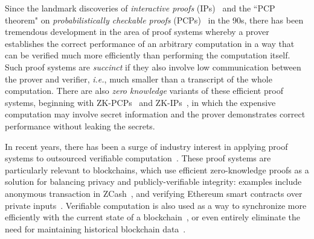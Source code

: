 
Since the landmark discoveries of \emph{interactive proofs} (IPs)~\cite{STOC:GolMicRac85} and the ``PCP theorem" on \emph{probabilistically checkable proofs} (PCPs)~\cite{STOC:BFLS91,FOCS:ALMSS92} in the 90s, there has been tremendous development in the area of proof systems whereby a prover establishes the correct performance of an arbitrary computation in a way that can be verified much more efficiently than performing the computation itself. Such proof systems are \emph{succinct} if they also involve low communication between the prover and verifier, \emph{i.e.}, much smaller than a transcript of the whole computation. There are also \emph{zero knowledge} variants of these efficient proof systems, beginning with ZK-PCPs~\cite{STOC:Kilian92} and ZK-IPs~\cite{C:BGGHKMR88}, in which the expensive computation may involve secret information and the prover demonstrates correct performance without leaking the secrets. 

In recent years, there has been a surge of industry interest in applying proof systems to outsourced verifiable computation~\cite{Sources}. These proof systems are particularly relevant to blockchains, which use efficient zero-knowledge proofs as a solution for balancing privacy and publicly-verifiable integrity: examples include anonymous transaction in ZCash~\cite{SP:BCGGMT14,Zcash}, and verifying Ethereum smart contracts over private inputs~\cite{ZKContracts}. Verifiable computation is also used as a way to synchronize more efficiently with the current state of a blockchain~\cite{Rollup}, or even entirely eliminate the need for maintaining historical blockchain data~\cite{Coda}. 

